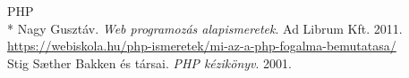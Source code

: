 \begin{thebibliography}{x}

 PHP\\*
Nagy Gusztáv. \textit{Web programozás alapismeretek}. Ad Librum Kft. 2011.
\\ \url{https://webiskola.hu/php-ismeretek/mi-az-a-php-fogalma-bemutatasa/}
\\ Stig Sæther Bakken és társai. \textit{PHP kézikönyv}. 2001.


\end{thebibliography}